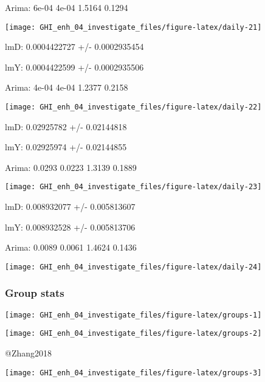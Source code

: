 \documentclass[
  10pt,
  a4paper,oneside]{article}
\begin{document}
Arima: 6e-04 4e-04 1.5164 0.1294

\begin{center}\texttt{[image: GHI\_enh\_04\_investigate\_files/figure-latex/daily-21]} \end{center}

lmD: 0.0004422727 +/- 0.0002935454

lmY: 0.0004422599 +/- 0.0002935506

Arima: 4e-04 4e-04 1.2377 0.2158

\begin{center}\texttt{[image: GHI\_enh\_04\_investigate\_files/figure-latex/daily-22]} \end{center}

lmD: 0.02925782 +/- 0.02144818

lmY: 0.02925974 +/- 0.02144855

Arima: 0.0293 0.0223 1.3139 0.1889

\begin{center}\texttt{[image: GHI\_enh\_04\_investigate\_files/figure-latex/daily-23]} \end{center}

lmD: 0.008932077 +/- 0.005813607

lmY: 0.008932528 +/- 0.005813706

Arima: 0.0089 0.0061 1.4624 0.1436

\begin{center}\texttt{[image: GHI\_enh\_04\_investigate\_files/figure-latex/daily-24]} \end{center}

\newpage
\FloatBarrier

\hypertarget{group-stats}{%
\subsubsection{Group stats}\label{group-stats}}

\begin{center}\texttt{[image: GHI\_enh\_04\_investigate\_files/figure-latex/groups-1]} \end{center}

\begin{center}\texttt{[image: GHI\_enh\_04\_investigate\_files/figure-latex/groups-2]} \end{center}

@Zhang2018

\begin{center}\texttt{[image: GHI\_enh\_04\_investigate\_files/figure-latex/groups-3]} \end{center}
\end{document}
